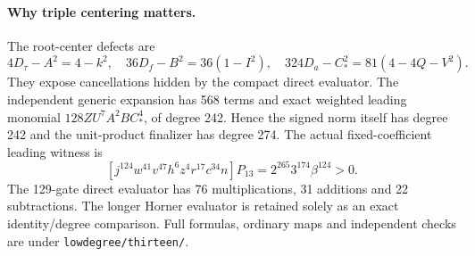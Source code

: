 \paragraph{Why triple centering matters.}
The root-center defects are
\[
 4D_\tau-A^2=4-k^2,\quad
 36D_f-B^2=36(1-I^2),\quad
 324D_a-C_*^2=81(4-4Q-V^2).
\]
They expose cancellations hidden by the compact direct evaluator.  The
independent generic expansion has 568 terms and exact weighted leading
monomial $128ZU^7A^2BC_*^4$, of degree 242.  Hence the signed norm itself
has degree 242 and the unit-product finalizer has degree 274.  The actual
fixed-coefficient leading witness is
\[
 [j^{124}w^{41}v^{47}h^6z^4r^{17}c^{34}n]P_{13}
 =2^{265}3^{174}\beta^{124}>0.
\]
The 129-gate direct evaluator has 76 multiplications, 31 additions and 22
subtractions.  The longer Horner evaluator is retained solely as an exact
identity/degree comparison.  Full formulas, ordinary maps and independent
checks are under \texttt{lowdegree/thirteen/}.
